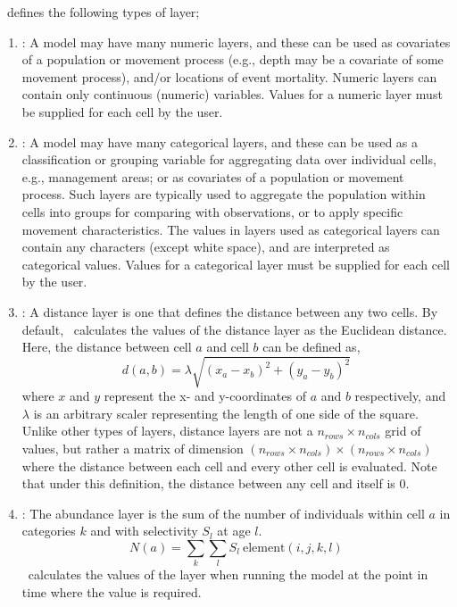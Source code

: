 \SPM\ defines the following types of layer;

\begin{enumerate}
\item{\label{numeric-layer}}: A model may have many numeric layers, and these can be used as covariates of a population or movement process (e.g., depth may be a covariate of some movement process), and/or locations of event mortality. Numeric layers can contain only continuous (numeric) variables. Values for a numeric layer must be supplied for each cell by the user.

\item {\label{categorical-layer}}: A model may have many categorical layers, and these can be used as a classification or grouping variable for aggregating data over individual cells, e.g., management areas; or as covariates of a population or movement process. Such layers are typically used to aggregate the population within cells into groups for comparing with observations, or to apply specific movement characteristics. The values in layers used as categorical layers can contain any characters (except white space), and are interpreted as categorical values. Values for a categorical layer must be supplied for each cell by the user.

\item {}: A distance layer is one that defines the distance between any two cells. By default, \SPM\ calculates the values of the distance layer as the Euclidean distance. Here, the distance between cell $a$ and cell $b$ can be defined as,
\begin{equation}
  d(a,b) = \lambda \sqrt{(x_a - x_b)^2 + (y_a - y_b)^2}
\end{equation}
where $x$ and $y$ represent the x- and y-coordinates of $a$ and $b$ respectively, and $\lambda$ is an arbitrary scaler representing the length of one side of the square. Unlike other types of layers, distance layers are not a $n_{rows} \times n_{cols}$ grid of values, but rather a matrix of dimension $(n_{rows} \times n_{cols}) \times (n_{rows} \times n_{cols})$  where the distance between each cell and every other cell is evaluated. Note that under this definition, the distance between any cell and itself is 0. 

\item{}: The abundance layer is the sum of the number of individuals within cell $a$ in categories $k$ and with selectivity $S_l$ at age $l$. 
\begin{equation}
  N(a) = \sum\limits_{k} \sum\limits_l S_l \ \text{element}(i,j,k,l)
\end{equation}
\SPM\ calculates the values of the layer when running the model at the point in time where the value is required.


\end{enumerate}
